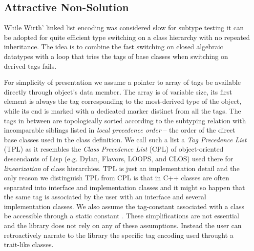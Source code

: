\subsection{Attractive Non-Solution}
\label{sec:cotc}



While Wirth' linked list encoding was considered slow for subtype testing it can 
be adopted for quite efficient type switching on a class hierarchy with no 
repeated inheritance. The idea is to combine the fast switching on closed 
algebraic datatypes with a loop that tries the tags of base classes when 
switching on derived tags fails.


For simplicity of presentation we assume a pointer to array of tags be available 
directly through object's  data member. The array is of 
variable size, its first element is always the tag corresponding to the 
most-derived type of the object, while its end is marked with a dedicated 
 marker distinct from all the tags. The tags in between are 
topologically sorted according to the subtyping relation with incomparable 
siblings listed in \emph{local precedence order} -- the order of the direct base 
classes used in the class definition. We call such a list a \emph{Tag Precedence 
List} (TPL) as it resembles the \emph{Class Precedence List} (CPL) of 
object-oriented descendants of Lisp (e.g. Dylan, Flavors, LOOPS, and CLOS) used 
there for \emph{linearization} of class hierarchies. TPL is just an implementation 
detail and the only reason we distinguish TPL from CPL is that in C++ classes 
are often separated into interface and implementation classes and it might so 
happen that the same tag is associated by the user with an interface and several 
implementation classes. We also assume the tag-constant associated with a class 
 be accessible through a static constant . These 
simplifications are not essential and the library does not rely on any of these 
assumptions. Instead the user can retroactively narrate to the library the 
specific tag encoding used throught a trait-like classes.


